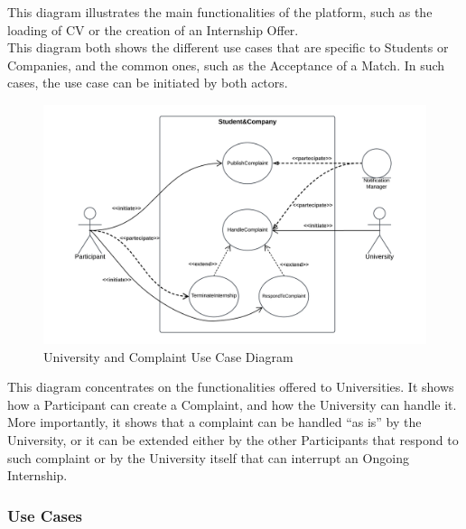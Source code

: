 This diagram illustrates the main functionalities of the platform, such as the loading of CV or the creation of an Internship Offer. \\
This diagram both shows the different use cases that are specific to Students or Companies, and the common ones, such as the Acceptance of a Match. In such cases, the use case can be initiated by both actors.
\clearpage
\begin{figure}[H]
    \centering
    \includegraphics[width=1 \textwidth]{Diagrams/UseDiagrams/UniversityUseCaseDiagram.png}
    \caption{University and Complaint Use Case Diagram}
    \label{fig:UniveristyUseCaseDiagram}
\end{figure}
This diagram concentrates on the functionalities offered to Universities. It shows how a Participant can create a Complaint, and how the University can handle it. \\
More importantly, it shows that a complaint can be handled “as is” by the University, or it can be extended either by the other Participants that respond to such complaint or by the University itself that can interrupt an Ongoing Internship.
\clearpage

\subsubsection{Use Cases}

